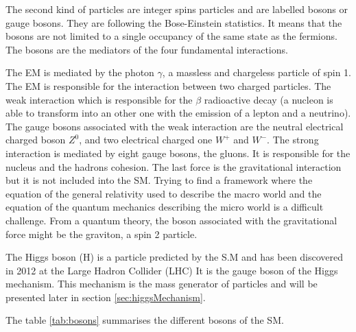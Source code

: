     The second kind of particles are integer spins particles and are labelled bosons or gauge bosons.
    They are following the Bose-Einstein statistics. 
    It means that the bosons are not limited to a single occupancy of the same state as the fermions.
    The bosons are the mediators of the four fundamental interactions.    
    
    The \gls{EM} is mediated by the photon $\gamma$, a massless and chargeless particle of spin 1.
    The EM is responsible for the interaction between two charged particles.
    The weak interaction which is responsible for the $\beta$ radioactive decay (a nucleon is able to transform into an other one with the emission of a lepton and a neutrino).
    The gauge bosons associated with the weak interaction are the neutral electrical charged boson $Z^0$, and two electrical charged one $W^+$ and $W^-$.
    The strong interaction is mediated by eight gauge bosons, the gluons.
    It is responsible for the nucleus and the hadrons cohesion.
    The last force is the gravitational interaction but it is not included into the \gls{SM}.
    Trying to find a framework where the equation of the general relativity used to describe the macro world and the equation of the quantum mechanics describing the micro world is a difficult challenge.
    From a quantum theory, the boson associated with the gravitational force might be the graviton, a spin 2 particle. 

    The Higgs boson (H) is a particle predicted by the S.M and has been discovered in 2012 at the Large Hadron Collider (LHC)
    It is the gauge boson of the Higgs mechanism.
    This mechanism is the mass generator of particles and will be presented later in section \ref{sec:higgsMechanism}.
    
    The table \ref{tab:bosons} summarises the different bosons of the \gls{SM}.

